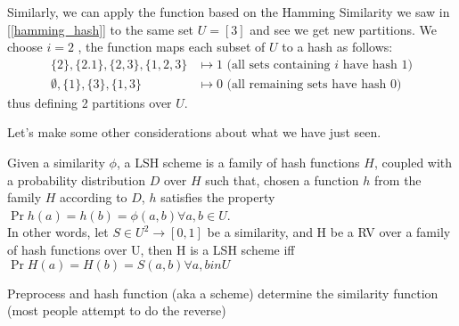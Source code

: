 	\ex Similarly, we can apply the function based on the Hamming Similarity we saw in [\ref{hamming_hash}] to the same set $U=[3]$ and see we get new partitions. We choose $i = 2$ \uar, the function maps each subset of $U$ to a hash as follows:
	\begin{align*}
	\{2\}, \{2.1\}, \{2,3\}, \{1,2,3\} &\mapsto 1 \text{ (all sets containing $i$ have hash 1)} \\
	\emptyset, \{1\}, \{3\}, \{1,3\} &\mapsto 0 \text{ (all remaining sets have hash 0)}
	\end{align*}
	thus defining 2 partitions over $U$.
	
	Let's make some other considerations about what we have just seen.
	
	
	
	
	
	\obs Given a similarity $\phi$, a LSH scheme is a family of hash functions $H$, coupled with a probability distribution $D$ over $H$ such that, chosen a function $h$ from the family $H$ according to $D$, $h$ satisfies the property $\Pr{h(a)=h(b)} = \phi(a,b) \forall a,b \in U$. \\
	In other words, let $S \in U^2 \to [0, 1]$ be a similarity, and H be a RV over a family of hash functions over U, then H is a LSH scheme iff $\Pr{H(a)=H(b)} = S(a,b) \forall a,b in U$
	
	
	
	
	
	
	\obs Preprocess and hash function (aka a scheme) determine the similarity function (most people attempt to do the reverse)
	
